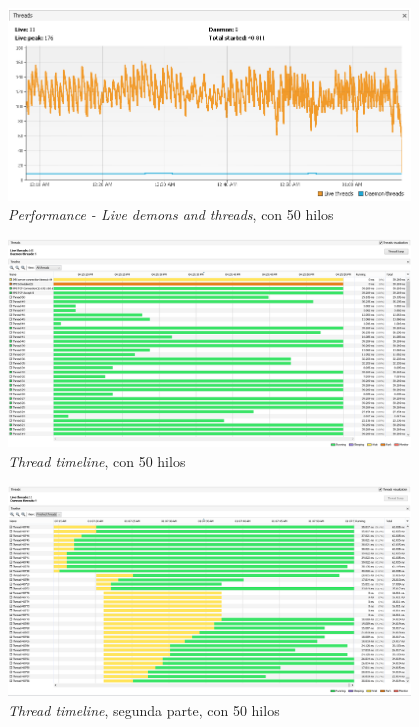 \begin{figure}[H]
\centering
\includegraphics[width=0.95\textwidth]{images/Performance_LIVE_50_Threads}
\caption{\emph{Performance - Live demons and threads}, con 50 hilos}
\label{fig:6.36}
\end{figure}

\begin{figure}[H]
\centering
\includegraphics[width=0.95\textwidth]{images/Running_Time_50_Threads}
\caption{\emph{Thread timeline}, con 50 hilos}
\label{fig:6.37}
\end{figure}

\begin{figure}[H]
\centering
\includegraphics[width=0.95\textwidth]{images/Running_Time_50_Threads_Part_2}
\caption{\emph{Thread timeline}, segunda parte, con 50 hilos}
\label{fig:6.38}
\end{figure}

